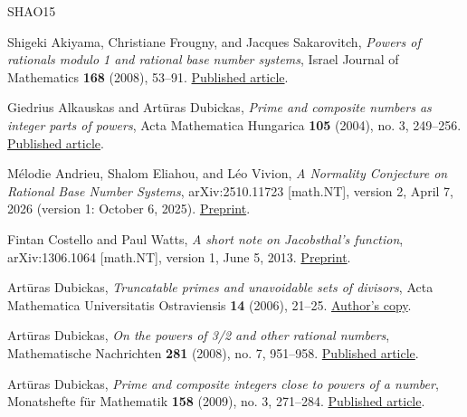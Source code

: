 \documentclass[11pt,reqno]{amsart}
\theoremstyle{definition}
\theoremstyle{definition}
\theoremstyle{remark}
\begin{document}
\begin{thebibliography}{SHAO15}

\label{ref-afs08}
Shigeki Akiyama, Christiane Frougny, and Jacques Sakarovitch,
\emph{Powers of rationals modulo 1 and rational base number systems},
Israel Journal of Mathematics \textbf{168} (2008), 53--91.
\href{https://doi.org/10.1007/s11856-008-1056-4}{Published article}.

\label{ref-ad04}
Giedrius Alkauskas and Artūras Dubickas, \emph{Prime and composite
numbers as integer parts of powers}, Acta Mathematica Hungarica
\textbf{105} (2004), no. 3, 249--256.
\href{https://doi.org/10.1023/B:AMHU.0000049291.38284.2c}{Published article}.

\label{ref-aev26}
Mélodie Andrieu, Shalom Eliahou, and Léo Vivion, \emph{A
Normality Conjecture on Rational Base Number Systems}, arXiv:2510.11723
{[}math.NT{]}, version 2, April 7, 2026 (version 1: October 6, 2025).
\href{https://arxiv.org/abs/2510.11723v2}{Preprint}.

\label{ref-cw13}
Fintan Costello and Paul Watts, \emph{A short note on
Jacobsthal's function}, arXiv:1306.1064 {[}math.NT{]}, version 1, June 5,
2013. \href{https://arxiv.org/abs/1306.1064v1}{Preprint}.

\label{ref-dub06}
Artūras Dubickas, \emph{Truncatable primes and unavoidable sets of
divisors}, Acta Mathematica Universitatis Ostraviensis \textbf{14}
(2006), 21--25.
\href{https://klevas.mif.vu.lt/~dubickas/files/dvifai/cekko1.pdf}{Author's copy}.

\label{ref-dub08}
Artūras Dubickas, \emph{On the powers of 3/2 and other rational
numbers}, Mathematische Nachrichten \textbf{281} (2008), no. 7, 951--958.
\href{https://doi.org/10.1002/mana.200510651}{Published article}.

\label{ref-dub09}
Artūras Dubickas, \emph{Prime and composite integers close to powers of
a number}, Monatshefte für Mathematik \textbf{158} (2009), no. 3,
271--284. \href{https://doi.org/10.1007/s00605-008-0042-6}{Published article}.


\end{thebibliography}
\end{document}
